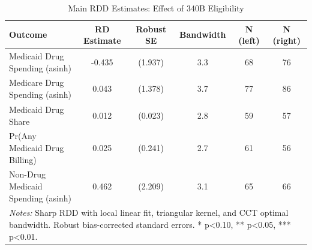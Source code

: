 \begin{table}[!h]
\centering
\caption{\label{tab:tab:main}Main RDD Estimates: Effect of 340B Eligibility}
\centering
\begin{tabular}[t]{lccccc}
\toprule
Outcome & RD Estimate & Robust SE & Bandwidth & N (left) & N (right)\\
\midrule
Medicaid Drug Spending (asinh) & -0.435 & (1.937) & 3.3 & 68 & 76\\
Medicare Drug Spending (asinh) & 0.043 & (1.378) & 3.7 & 77 & 86\\
Medicaid Drug Share & 0.012 & (0.023) & 2.8 & 59 & 57\\
Pr(Any Medicaid Drug Billing) & 0.025 & (0.241) & 2.7 & 61 & 56\\
Non-Drug Medicaid Spending (asinh) & 0.462 & (2.209) & 3.1 & 65 & 66\\
\bottomrule
\multicolumn{6}{l}{\rule{0pt}{1em}\textit{Notes:} Sharp RDD with local linear fit, triangular kernel, and CCT optimal bandwidth. Robust bias-corrected standard errors. * p<0.10, ** p<0.05, *** p<0.01.}\\
\end{tabular}
\end{table}
